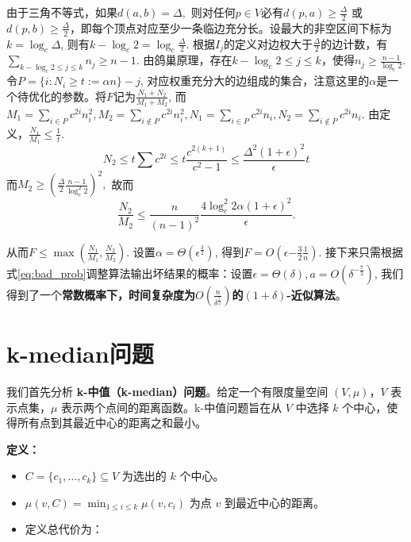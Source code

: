 \documentclass[lang=cn,newtx,10pt,scheme=chinese,chinesefont=nofont,citestyle=gb7714-2015, bibstyle=gb7714-2015]{elegantbook}
\begin{document}
\begin{refsection}
由于三角不等式，如果$d(a,b)=\Delta,$ 则对任何$p\in V$必有$d(p,a)\geq \frac{\Delta}{2}$ 或 $d(p,b)
\geq \frac{\Delta}{2}$，即每个顶点对应至少一条临边充分长。设最大的非空区间下标为$k=\log_c \Delta$, 则有$k-\log_c 2=\log_c \frac{\Delta}{2}.$ 根据$I_j$的定义对边权大于$\frac{\Delta}{2}$的边计数，有$\sum_{k-\log_c 2\leq j\leq k} n_j\geq n-1$. 由鸽巢原理，存在$k-\log_c 2\leq j\leq k$，使得$n_j\geq\frac{n-1}{\log_c 2}$. 令$P=\{i:N_i\geq t:=\alpha n\}-{j}$, 对应权重充分大的边组成的集合，注意这里的$\alpha$是一个待优化的参数。将$F$记为$\frac{N_1+N_2}{M_1+M_2}$, 而$M_{1}=\sum_{i\in P}c^{2i}n_{i}^{2},M_{2}=\sum_{i\notin P}c^{2i}n_{i}^{2},  N_{1}=\sum_{i\in P}c^{2i}n_{i}, N_{2}=\sum_{i\notin P}c^{2i}n_{i}. $
由定义，$\frac{N_{1}}{M_{1}}\leq\frac{1}{t}$. 
$$  N_{2}\leq t\sum c^{2i}\leq t\frac{c^{2(k+1)}}{c^{2}-1}\leq\frac{\Delta^{2}(1+\epsilon)^{2}}{\epsilon}t $$
 而$ M_{2}\geq(\frac{\Delta}{2}\frac{n-1}{\log_{c}^{2}2})^{2}, $
 故而
 $$ \frac{N_{2}}{M_{2}}\leq\frac{n}{(n-1)^2}\frac{4\log_{c}^{2}2\alpha(1+\epsilon)^{2}}{\epsilon}.$$

从而$F\leq \max(\frac{N_1}{M_1},\frac{N_2}{M_2})$. 设置$\alpha=\Theta(\epsilon^\frac{3}{2})$, 得到$F=O(\epsilon{-\frac{3}{2}}\frac{1}{n})$. 接下来只需根据式\eqref{eq:bad_prob}调整算法输出坏结果的概率：设置$\epsilon=\Theta(\delta), a=O(\delta^{-\frac{7}{2}})$, 我们得到了一个\textbf{常数概率下，时间复杂度为$O(\frac{n}{\delta^\frac{7}{2}})$的$(1+\delta)$-近似算法}。



\section{k-median问题}
我们首先分析 \textbf{k-中值（k-median）问题}。给定一个有限度量空间 $(V, \mu)$，$V$ 表示点集，$\mu$ 表示两个点间的距离函数。k-中值问题旨在从 $V$ 中选择 $k$ 个中心，使得所有点到其最近中心的距离之和最小。

\vspace{1em}
\noindent\textbf{定义：}
\begin{itemize}
  \item $C = \{c_1, \dots, c_k\} \subseteq V$ 为选出的 $k$ 个中心。
  \item $\mu(v, C) = \min_{1 \le i \le k} \mu(v, c_i)$ 为点 $v$ 到最近中心的距离。
  \item 定义总代价为：
  


\end{itemize}
\end{refsection}
\end{document}
